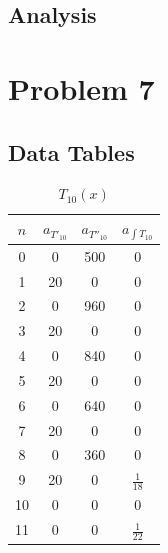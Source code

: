 \documentclass[11pt]{article} %
\begin{document}
{\subsection*{Analysis}




\section*{Problem 7}
\subsection*{Data Tables}
{\renewcommand{\arraystretch}{1.1} %
\begin{table}[H]
\begin{minipage}{.5\linewidth}
\centering
\caption*{$T_{10}(x)$}
\begin{tabular}{| c | c | c | c |}
\hline 
$n$ & $a_{T'_{10}}$ & $a_{T''_{10}}$ & $a_{\int T_{10}}$ \\
\hline \hline
0 & 0 & 500 & 0\\
1 & 20 & 0 & 0\\
2 & 0& 960 & 0\\
3 & 20& 0& 0\\
4 & 0 & 840& 0\\
5 & 20 & 0 & 0\\
6 & 0 & 640 & 0\\
7 & 20 & 0 & 0\\
8 & 0 & 360 & 0\\
9 & 20 & 0 & $\frac{1}{18}$\\
10 & 0 & 0 & 0\\
11 &  0& 0& $\frac{1}{22}$\\
\hline
\end{tabular}
\end{minipage} 


\end{table}}}
\end{document}
